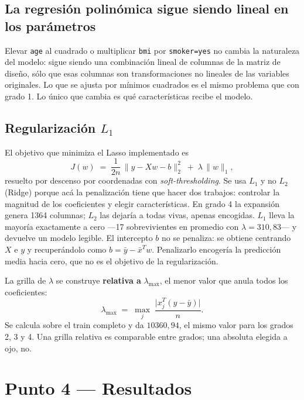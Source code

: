 \documentclass[11pt,a4paper]{article}
\begin{document}
\subsection{La regresión polinómica sigue siendo lineal en los parámetros}

Elevar \texttt{age} al cuadrado o multiplicar \texttt{bmi} por \texttt{smoker=yes} no cambia la
naturaleza del modelo: sigue siendo una combinación lineal de columnas de la matriz de diseño,
sólo que esas columnas son transformaciones no lineales de las variables originales. Lo que se
ajusta por mínimos cuadrados es el mismo problema que con grado 1. Lo único que cambia es qué
características recibe el modelo.

\subsection{Regularización $L_1$}

El objetivo que minimiza el Lasso implementado es
\begin{equation}
J(w) \;=\; \frac{1}{2n}\,\lVert y - Xw - b \rVert_2^{2} \;+\; \lambda\,\lVert w \rVert_1 ,
\end{equation}
resuelto por descenso por coordenadas con \emph{soft-thresholding}. Se usa $L_1$ y no $L_2$
(Ridge) porque acá la penalización tiene que hacer dos trabajos: controlar la magnitud de los
coeficientes y elegir características. En grado 4 la expansión genera 1364 columnas; $L_2$ las
dejaría a todas vivas, apenas encogidas. $L_1$ lleva la mayoría exactamente a cero ---17
sobrevivientes en promedio con $\lambda = 310{,}83$--- y devuelve un modelo legible. El
intercepto $b$ no se penaliza: se obtiene centrando $X$ e $y$ y recuperándolo como
$b = \bar{y} - \bar{x}^{T} w$. Penalizarlo encogería la predicción media hacia cero, que no es
el objetivo de la regularización.

La grilla de $\lambda$ se construye \textbf{relativa a} $\lambda_{\max}$, el menor valor que
anula todos los coeficientes:
\begin{equation}
\lambda_{\max} \;=\; \max_{j}\;\frac{\lvert x_j^{T}(y - \bar{y}) \rvert}{n} .
\end{equation}
Se calcula sobre el train completo y da $10360{,}94$, el mismo valor para los grados 2, 3 y 4.
Una grilla relativa es comparable entre grados; una absoluta elegida a ojo, no.

\section{Punto 4 --- Resultados}
\end{document}
